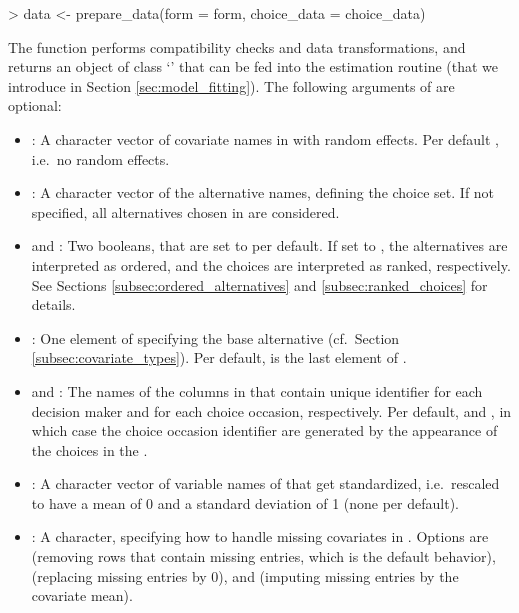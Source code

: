 \documentclass[article,shortnames]{jss}
\newcommand{\class}[1]{`\code{#1}'}
\newcommand{\fct}[1]{\code{#1()}}
\begin{document}
\begin{Schunk}
\begin{Sinput}
> data <- prepare_data(form = form, choice_data = choice_data)
\end{Sinput}
\end{Schunk}

The function performs compatibility checks and data transformations, and returns an object of class \class{RprobitB\_data} that can be fed into the estimation routine \fct{fit\_model} (that we introduce in Section \ref{sec:model_fitting}). The following arguments of \fct{prepare\_data} are optional:
\begin{itemize}
  \item {}: A character vector of covariate names in  with random effects. Per default , i.e.\ no random effects.
  \item {}: A character vector of the alternative names, defining the choice set. If not specified, all alternatives chosen in  are considered.
  \item {} and : Two booleans, that are set to  per default. If set to , the alternatives are interpreted as ordered, and the choices are interpreted as ranked, respectively. See Sections \ref{subsec:ordered_alternatives} and \ref{subsec:ranked_choices} for details.
  \item {}: One element of  specifying the base alternative (cf.\ Section \ref{subsec:covariate_types}). Per default,  is the last element of .
  \item {} and : The names of the columns in  that contain unique identifier for each decision maker and for each choice occasion, respectively. Per default,  and , in which case the choice occasion identifier are generated by the appearance of the choices in the .
  \item {}: A character vector of variable names of  that get standardized, i.e.\ rescaled to have a mean of 0 and a standard deviation of 1 (none per default).
  \item {}: A character, specifying how to handle missing covariates in . Options are  (removing rows that contain missing entries, which is the default behavior),  (replacing missing entries by 0), and  (imputing missing entries by the covariate mean).
\end{itemize}
\end{document}
